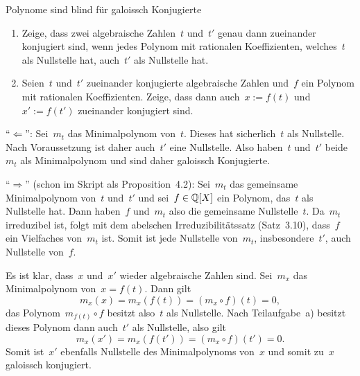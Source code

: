 \documentclass{algblatt}
\begin{document}
\begin{aufgabe}{Polynome sind blind für galoissch Konjugierte}
\begin{enumerate}
\item Zeige, dass zwei algebraische Zahlen~$t$ und~$t'$ genau dann zueinander
konjugiert sind,
wenn jedes Polynom mit
rationalen Koeffizienten, welches~$t$ als Nullstelle hat, auch~$t'$ als
Nullstelle hat.
\item Seien~$t$ und~$t'$ zueinander konjugierte algebraische Zahlen
und~$f$ ein Polynom mit rationalen Koeffizienten. Zeige, dass dann auch~$x := f(t)$ und~$x' := f(t')$ zueinander konjugiert sind.
\end{enumerate}

\begin{loesungE}
\item "`$\Longleftarrow$"': Sei~$m_t$ das Minimalpolynom von~$t$. Dieses hat
sicherlich~$t$ als Nullstelle. Nach Voraussetzung ist daher auch~$t'$ eine
Nullstelle. Also haben~$t$ und~$t'$ beide~$m_t$ als Minimalpolynom und sind
daher galoissch Konjugierte.

"`$\Longrightarrow$"' (schon im Skript als Proposition~4.2): Sei~$m_t$ das
gemeinsame Minimalpolynom von~$t$ und~$t'$
und sei~$f \in \mathbb{Q}[X]$ ein Polynom, das~$t$ als Nullstelle hat. Dann
haben~$f$ und~$m_t$ also die gemeinsame Nullstelle~$t$. Da~$m_t$ irreduzibel
ist, folgt mit dem abelschen Irreduzibilitätssatz (Satz~3.10), dass~$f$ ein
Vielfaches von~$m_t$ ist. Somit ist jede Nullstelle von~$m_t$,
insbesondere~$t'$, auch Nullstelle von~$f$.

\item Es ist klar, dass~$x$ und~$x'$ wieder algebraische Zahlen sind.
Sei~$m_x$ das Minimalpolynom von~$x = f(t)$. Dann gilt
\[ m_x(x) = m_x(f(t)) = (m_x \circ f)(t) = 0, \]
das Polynom~$m_{f(t)} \circ f$ besitzt also~$t$ als Nullstelle. Nach
Teilaufgabe~a) besitzt dieses Polynom dann auch~$t'$ als Nullstelle, also gilt
\[ m_x(x') = m_x(f(t')) = (m_x \circ f)(t') = 0. \]
Somit ist~$x'$ ebenfalls Nullstelle des Minimalpolynoms von~$x$ und somit
zu~$x$ galoissch konjugiert.
\end{loesungE}
\end{aufgabe}
\end{document}
